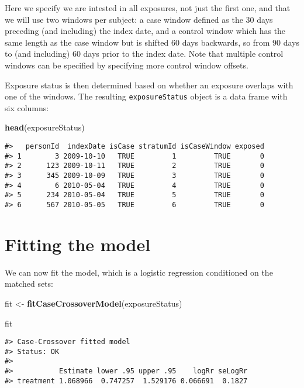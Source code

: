 \documentclass[]{article}
\newenvironment{Shaded}{\begin{snugshade}}{\end{snugshade}}
\newcommand{\KeywordTok}[1]{\textcolor[rgb]{0.13,0.29,0.53}{\textbf{#1}}}
\newcommand{\NormalTok}[1]{#1}
\newcommand{\StringTok}[1]{\textcolor[rgb]{0.31,0.60,0.02}{#1}}
\begin{document}
Here we specify we are intested in all exposures, not just the first
one, and that we will use two windows per subject: a case window defined
as the 30 days preceding (and including) the index date, and a control
window which has the same length as the case window but is shifted 60
days backwards, so from 90 days to (and including) 60 days prior to the
index date. Note that multiple control windows can be specified by
specifying more control window offsets.

Exposure status is then determined based on whether an exposure overlaps
with one of the windows. The resulting \texttt{exposureStatus} object is
a data frame with six columns:

\begin{Shaded}
\begin{Highlighting}[]
\KeywordTok{head}\NormalTok{(exposureStatus)}
\end{Highlighting}
\end{Shaded}

\begin{verbatim}
#>   personId  indexDate isCase stratumId isCaseWindow exposed
#> 1        3 2009-10-10   TRUE         1         TRUE       0
#> 2      123 2009-10-11   TRUE         2         TRUE       0
#> 3      345 2009-10-09   TRUE         3         TRUE       0
#> 4        6 2010-05-04   TRUE         4         TRUE       0
#> 5      234 2010-05-04   TRUE         5         TRUE       0
#> 6      567 2010-05-05   TRUE         6         TRUE       0
\end{verbatim}

\hypertarget{fitting-the-model}{%
\section{Fitting the model}\label{fitting-the-model}}

We can now fit the model, which is a logistic regression conditioned on
the matched sets:

\begin{Shaded}
\begin{Highlighting}[]
\NormalTok{fit <-}\StringTok{ }\KeywordTok{fitCaseCrossoverModel}\NormalTok{(exposureStatus)}

\NormalTok{fit}
\end{Highlighting}
\end{Shaded}

\begin{verbatim}
#> Case-Crossover fitted model
#> Status: OK
#> 
#>           Estimate lower .95 upper .95    logRr seLogRr
#> treatment 1.068966  0.747257  1.529176 0.066691  0.1827
\end{verbatim}
\end{document}
